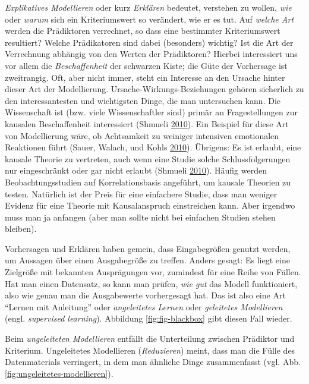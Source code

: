 \documentclass[12pt,ngerman,]{book}
\theoremstyle{definition}
\theoremstyle{definition}
\theoremstyle{remark}
\begin{document}
\emph{Explikatives Modellieren} oder
kurz \emph{Erklären} bedeutet, verstehen zu wollen,
\emph{wie} oder \emph{warum} sich ein Kriteriumswert so verändert, wie
er es tut. Auf \emph{welche Art} werden die Prädiktoren verrechnet, so
dass eine bestimmter Kriteriumswert resultiert? Welche Prädikatoren sind
dabei (besonders) wichtig? Ist die Art der Verrechnung abhängig von den
Werten der Prädiktoren? Hierbei interessiert uns vor allem die
\emph{Beschaffenheit} der schwarzen Kiste; die Güte der Vorhersage ist
zweitrangig. Oft, aber nicht immer, steht ein Interesse an den Ursache
hinter dieser Art der Modellierung. Ursache-Wirkungs-Beziehungen gehören
sicherlich zu den interessantesten und wichtigsten Dinge, die man
untersuchen kann. Die Wissenschaft ist (bzw. viele Wissenschaftler sind)
primär an Fragestellungen zur kausalen Beschaffenheit interessiert
(Shmueli \protect\hyperlink{ref-Shmueli2010}{2010}). Ein Beispiel für
diese Art von Modellierung wäre, ob Achtsamkeit zu weiniger intensiven
emotionalen Reaktionen führt (Sauer, Walach, und Kohls
\protect\hyperlink{ref-sauer2010gray}{2010}). Übrigens: Es ist erlaubt,
eine kausale Theorie zu vertreten, auch wenn eine Studie solche
Schlussfolgerungen nur eingeschränkt oder gar nicht erlaubt (Shmueli
\protect\hyperlink{ref-Shmueli2010}{2010}). Häufig werden
Beobachtungsstudien auf Korrelationsbasis angeführt, um kausale Theorien
zu testen. Natürlich ist der Preis für eine einfachere Studie, dass man
weniger Evidenz für eine Theorie mit Kausalanspruch einstreichen kann.
Aber irgendwo muss man ja anfangen (aber man sollte nicht bei einfachen
Studien stehen bleiben).

Vorhersagen und Erklären haben gemein, dass Eingabegrößen genutzt
werden, um Aussagen über einen Ausgabegröße zu treffen. Anders gesagt:
Es liegt eine Zielgröße mit bekannten Ausprägungen vor, zumindest für
eine Reihe von Fällen. Hat man einen Datensatz, so kann man prüfen,
\emph{wie gut} das Modell funktioniert, also wie genau man die
Ausgabewerte vorhergesagt hat. Das ist also eine Art ``Lernen mit
Anleitung'' oder \emph{angeleitetes Lernen}
oder \emph{geleitetes Modellieren} (engl. \emph{supervised learning}).
Abbildung \ref{fig:fig-blackbox} gibt diesen Fall wieder.

Beim \emph{ungeleiteten Modellieren}
entfällt die Unterteilung zwischen Prädiktor und Kriterium. Ungeleitetes
Modellieren (\emph{Reduzieren}) meint, dass man die
Fülle des Datenmaterials verringert, in dem man ähnliche Dinge
zusammenfasst (vgl. Abb. \ref{fig:ungeleitetes-modellieren}).
\end{document}
